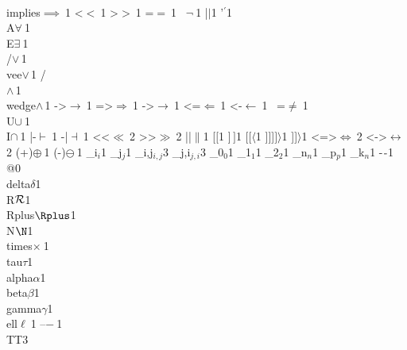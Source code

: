 {{        {\\implies}{{$\implies\ $}}1
        {<}{{$<\ $}}1
        {>}{{$>\ $}}1
        {=}{{$=\ $}}1
        {~}{{$\neg\ $}}1
        {|}{{$\mid$}}1
        {'}{{$^\prime$}}1
        {\\A}{{$\forall\ $}}1
        {\\E}{{$\exists\ $}}1
        {\\/}{{$\vee\,$}}1
        {\\vee}{{$\vee\,$}}1
        {/\\}{{$\wedge\,$}}1
        {\\wedge}{{$\wedge\,$}}1
        {->}{{$\rightarrow\ $}}1
        {=>}{{$\Rightarrow\ $}}1
        {->}{{$\rightarrow\ $}}1
        {<=}{{$\Leftarrow\ $}}1
        {<-}{{$\leftarrow\ $}}1
        {~=}{{$\neq\ $}}1
        {\\U}{{$\cup\ $}}1
        {\\I}{{$\cap\ $}}1
        {|-}{{$\vdash\ $}}1
        {-|}{{$\dashv\ $}}1
        {<<}{{$\ll\ $}}2
        {>>}{{$\gg\ $}}2
        {||}{{$\|$}}1
        {[}{{$[$}}1
        {]}{{$\,]$}}1
        {[[}{{$\langle$}}1
        {]]]}{{$]\rangle$}}1
        {]]}{{$\rangle$}}1
        {<=>}{{$\Leftrightarrow\ $}}2
        {<->}{{$\leftrightarrow\ $}}2
        {(+)}{{$\oplus\ $}}1
        {(-)}{{$\ominus\ $}}1
        {_i}{{$_{i}$}}1
        {_j}{{$_{j}$}}1
        {_{i,j}}{{$_{i,j}$}}3
        {_{j,i}}{{$_{j,i}$}}3
        {_0}{{$_0$}}1
        {_1}{{$_1$}}1
        {_2}{{$_2$}}1
        {_n}{{$_n$}}1
        {_p}{{$_p$}}1
        {_k}{{$_n$}}1
        {-}{{$\ms{-}$}}1
        {@}{{}}0
        {\\delta}{{$\delta$}}1
        {\\R}{{${\cal R}$}}1
        {\\Rplus}{{$\Rplus$}}1
        {\\N}{{$\N$}}1
        {\\times}{{$\times\ $}}1
        {\\tau}{{$\tau$}}1
        {\\alpha}{{$\alpha$}}1
        {\\beta}{{$\beta$}}1
        {\\gamma}{{$\gamma$}}1
        {\\ell}{{$\ell\ $}}1
        {--}{{$-\ $}}1
        {\\TT}{{\hspace{1.5em}}}3        
      }

}
